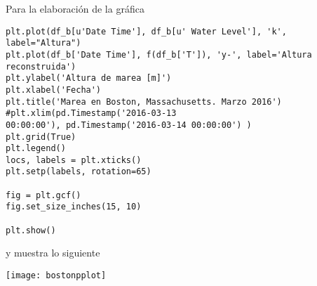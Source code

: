 \documentclass[12pt]{article}
\begin{document}
Para la elaboración de la gráfica

\begin{verbatim}
plt.plot(df_b[u'Date Time'], df_b[u' Water Level'], 'k', label="Altura")
plt.plot(df_b['Date Time'], f(df_b['T']), 'y-', label='Altura reconstruida')
plt.ylabel('Altura de marea [m]')
plt.xlabel('Fecha')
plt.title('Marea en Boston, Massachusetts. Marzo 2016')
#plt.xlim(pd.Timestamp('2016-03-13
00:00:00'), pd.Timestamp('2016-03-14 00:00:00') )
plt.grid(True)
plt.legend()
locs, labels = plt.xticks()
plt.setp(labels, rotation=65)

fig = plt.gcf()
fig.set_size_inches(15, 10)

plt.show()
\end{verbatim}

y muestra lo siguiente


\begin{center}
\texttt{[image: bostonpplot]}
\end{center}

        
\end{document}
